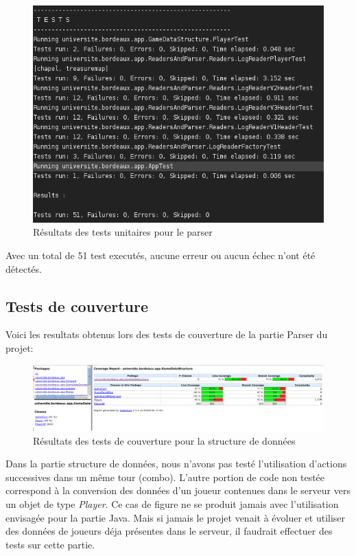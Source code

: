 \begin{figure}[!h]
  \begin{center}
\includegraphics[width=\textwidth,height=\textheight,keepaspectratio]{./unit_tests_jave}
  \end{center}
  \caption{Résultats des tests unitaires pour le parser}
\end{figure}

Avec un total de 51 test executés, aucune erreur ou aucun échec n'ont été détectés.

\subsection{Tests de couverture}
Voici les resultats obtenus lors des tests de couverture de la partie Parser du projet:

\begin{figure}[!h]
  \begin{center}
\includegraphics[width=\textwidth,height=\textheight,keepaspectratio]{./coverage_GameDataStructure}
\end{center}
  \caption{Résultats des tests de couverture pour la structure de données}
  \end{figure}

Dans la partie structure de données, nous n'avons pas testé l'utilisation d'actions successives dans un même tour (combo). L'autre portion de code non testée correspond à la conversion des données d'un joueur contenues dans le serveur vers un objet de type \textit{Player}. Ce cas de figure ne se produit jamais avec l'utilisation envisagée pour la partie Java. Mais si jamais le projet venait à évoluer et utiliser des données de joueurs déja présentes dans le serveur, il faudrait effectuer des tests sur cette partie.

